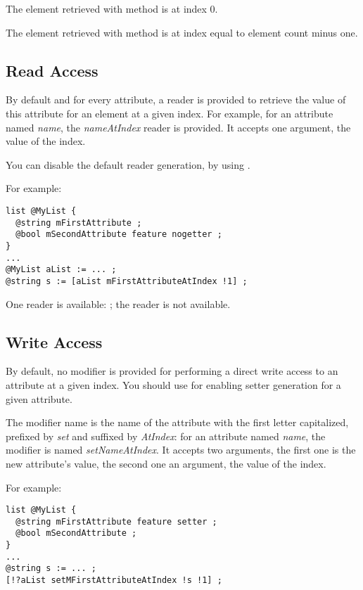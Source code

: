 The element retrieved with  method is at index 0.

The element retrieved with  method is at index equal to element count minus one.

\subsection{Read Access}

By default and for every attribute, a reader is provided to retrieve the value of this attribute for an element at a given index. For example, for an attribute named \emph{name}, the \emph{nameAtIndex} reader is provided. It accepts one  argument, the value of the index.

You can disable the default reader generation, by using .

For example:
\begin{lstlisting}[language=galgas]
list @MyList {
  @string mFirstAttribute ;
  @bool mSecondAttribute feature nogetter ;
}
...
@MyList aList := ... ;
@string s := [aList mFirstAttributeAtIndex !1] ;
\end{lstlisting}

One reader is available: ; the  reader is not available.


\subsection{Write Access}

By default, no modifier is provided for performing a direct write access to an attribute at a given index. You should use  for enabling setter generation for a given attribute.

The modifier name is the name of the attribute with the first letter capitalized, prefixed by \emph{set} and suffixed by \emph{AtIndex}: for an attribute named \emph{name}, the modifier is named \emph{setNameAtIndex}. It accepts two arguments, the first one is the new attribute's value, the second one an  argument, the value of the index.

For example:

\begin{lstlisting}[language=galgas]
list @MyList {
  @string mFirstAttribute feature setter ;
  @bool mSecondAttribute ;
}
...
@string s := ... ;
[!?aList setMFirstAttributeAtIndex !s !1] ;
\end{lstlisting}

